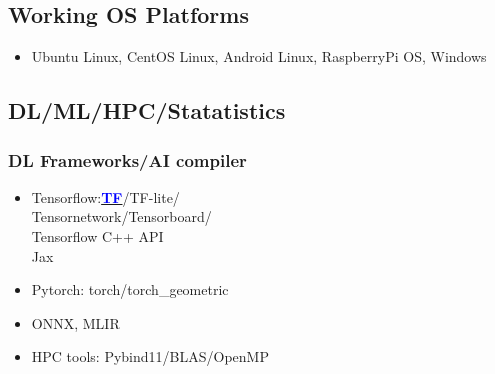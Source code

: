 \documentclass[11pt]{article}
\begin{document}
\begin{multicols*}{2}
\subsection*{Working OS Platforms}
\begin{itemize}[noitemsep]
    \item Ubuntu Linux, CentOS Linux, Android Linux, RaspberryPi OS, Windows
\end{itemize}

\subsection*{DL/ML/HPC/Statatistics}

\subsubsection*{DL Frameworks/AI compiler}
\begin{itemize}[noitemsep]
    \item Tensorflow:\href{https://github.com/Kuo-TingKai/TNNN}{\textbf{\textcolor{blue}{TF}}}/TF-lite/\\Tensornetwork/Tensorboard/\\Tensorflow C++ API\\
    Jax
    \item Pytorch: torch/torch\_geometric
    \item ONNX, MLIR
    \item HPC tools: Pybind11/BLAS/OpenMP 
\end{itemize}

\end{multicols*}
\end{document}
